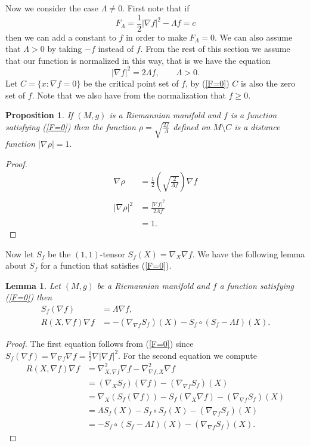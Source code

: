 \documentclass{amsart}
\theoremstyle{plain}
\newtheorem{lemma}[theorem]{\bf Lemma}
\newtheorem{proposition}[theorem]{\bf Proposition}
\numberwithin{equation}{section}
\begin{document}
Now we consider the case $\Lambda \neq 0$.  First note that if 
\[ F_{\Lambda}= \frac{1}{2} |\nabla f|^2 - \Lambda f = c\]
then we can add a constant to $f$ in order to make $F_{\Lambda}=0$.  We can also assume that $\Lambda >0$ by taking $-f$ instead of $f$.   From the rest of this section we  assume that our function is normalized in this way, that is we have the equation
\begin{equation} \label{F=0}
    |\nabla f|^2 =  2\Lambda f,  \qquad \Lambda >0.
\end{equation}
Let  $C = \{ x:  \nabla f = 0 \}$ be the critical point set of $f$, by (\ref{F=0}) $C$ is also the zero set of $f$.  Note that we also have from the normalization that $f\geq 0$.

\begin{proposition}
If $(M,g)$ is a Riemannian manifold and $f$ is a function satisfying (\ref{F=0}) then the function $\rho = \sqrt{\frac{2f}{\Lambda}}$ defined on $M \setminus C$ is a distance function $|\nabla \rho|=1.$
\end{proposition}

\begin{proof}
    \begin{align*}
        \nabla \rho &=  \frac{1}{2}\left(  \sqrt{\frac{2}{\Lambda f }} \right) \nabla f \\ \\ |\nabla \rho|^2  &= \frac{|\nabla f|^2}{2 \Lambda f} \\ \\
        &=  1.
         \end{align*}
\end{proof}


Now let $S_f$ be the $(1,1)$-tensor $S_f(X) = \nabla_X \nabla f$.  We have the following lemma about $S_f$ for a function that satisfies (\ref{F=0}). 

\begin{lemma} \label{radial-eqn}
Let $(M,g)$ be a Riemannian manifold and $f$ a function satisfying (\ref{F=0}) then 
\begin{align*}
S_f(\nabla f ) &= \Lambda \nabla f, \\ 
R(X, \nabla f) \nabla f &= -(\nabla_{\nabla f}S_f)(X) - S_f\circ(S_f-\Lambda I)(X).
\end{align*}
\end{lemma}
\begin{proof}
The first equation follows from (\ref{F=0}) since $S_f(\nabla f) = \nabla_{\nabla f} \nabla f = \frac{1}{2} \nabla |\nabla f|^2$. For the second equation we compute
\begin{align*} 
R(X,\nabla f)\nabla f & =\nabla^2_{X,\nabla f}\nabla f-\nabla^2_{\nabla f,X}\nabla f \\  &= \left(\nabla_XS_f\right)(\nabla f) - \left(\nabla_{\nabla f}S_f\right)(X)\\
&= \nabla_X (S_f(\nabla f)) - S_f(\nabla_X \nabla f) - \left(\nabla_{\nabla f}S_f\right)(X)\\
&= \Lambda S_f(X) - S_f \circ S_f(X) - \left(\nabla_{\nabla f}S_f\right)(X)\\
&= - S_f\circ(S_f-\Lambda I)(X) - \left(\nabla_{\nabla f}S_f\right)(X).
\end{align*}
\end{proof}
\end{document}

